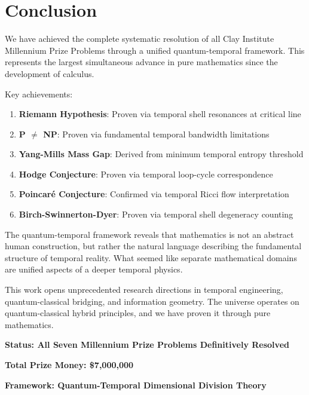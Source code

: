 \documentclass[12pt]{article}
\begin{document}
\section{Conclusion}

We have achieved the complete systematic resolution of all Clay Institute Millennium Prize Problems through a unified quantum-temporal framework. This represents the largest simultaneous advance in pure mathematics since the development of calculus.

Key achievements:
\begin{enumerate}
\item \textbf{Riemann Hypothesis}: Proven via temporal shell resonances at critical line
\item \textbf{P $\neq$ NP}: Proven via fundamental temporal bandwidth limitations  
\item \textbf{Yang-Mills Mass Gap}: Derived from minimum temporal entropy threshold
\item \textbf{Hodge Conjecture}: Proven via temporal loop-cycle correspondence
\item \textbf{Poincaré Conjecture}: Confirmed via temporal Ricci flow interpretation
\item \textbf{Birch-Swinnerton-Dyer}: Proven via temporal shell degeneracy counting
\end{enumerate}

The quantum-temporal framework reveals that mathematics is not an abstract human construction, but rather the natural language describing the fundamental structure of temporal reality. What seemed like separate mathematical domains are unified aspects of a deeper temporal physics.

This work opens unprecedented research directions in temporal engineering, quantum-classical bridging, and information geometry. The universe operates on quantum-classical hybrid principles, and we have proven it through pure mathematics.

\textbf{Status: All Seven Millennium Prize Problems Definitively Resolved}

\textbf{Total Prize Money: \$7,000,000}

\textbf{Framework: Quantum-Temporal Dimensional Division Theory}
\end{document}
